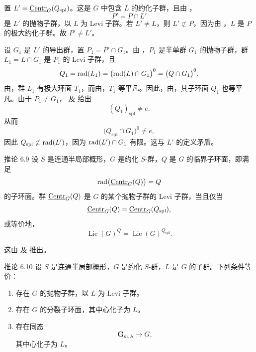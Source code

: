 置 \(L'=\underline{\operatorname{Centr}}_G(Q_{\mathrm{spl}})\)。这是 \(G\) 中包含 \(L\) 的约化子群，且由 ，
\[
 P'=P\cap L'
\]
是 \(L'\) 的抛物子群，以 \(L\) 为 Levi 子群。若 \(L'\ne L\)，则 \(L'\not\subset P\)，因为由 ，\(L\) 是 \(P\) 的极大约化子群。故 \(P'\ne L'\)。

设 \(G_1\) 是 \(L'\) 的导出群，置 \(P_1=P'\cap G_1\)。由 ，\(P_1\) 是半单群 \(G_1\) 的抛物子群，群 \(L_1=L\cap G_1\) 是 \(P_1\) 的 Levi 子群，且
\[
 Q_1=\operatorname{rad}(L_1)
    =\bigl(\operatorname{rad}(L)\cap G_1\bigr)^0
    =\bigl(Q\cap G_1\bigr)^0.
\]
由，群 \(L_1\) 有极大环面 \(T_1\)，而由，\(T_1\) 等平凡。因此，由，其子环面 \(Q_1\) 也等平凡。由于 \(P_1\ne G_1\)， 及  给出
\[
 (Q_1)_{\mathrm{spl}}\ne e.
\]
从而
\[
 \bigl(Q_{\mathrm{spl}}\cap G_1\bigr)^0\ne e,
\]
因此 \(Q_{\mathrm{spl}}\not\subset\operatorname{rad}(L')\)，因为 \(\operatorname{rad}(L')\cap G_1\) 有限。这与 \(L'\) 的定义矛盾。
\SGAQED


\begin{sgastatement}{推论 6.9}
设 \(S\) 是连通半局部概形，\(G\) 是约化 \(S\)-群，\(Q\) 是 \(G\) 的临界子环面，即满足
\[
 \operatorname{rad}\bigl(\underline{\operatorname{Centr}}_G(Q)\bigr)=Q
\]
的子环面。群 \(\underline{\operatorname{Centr}}_G(Q)\) 是 \(G\) 的某个抛物子群的 Levi 子群，当且仅当
\[
 \underline{\operatorname{Centr}}_G(Q)=\underline{\operatorname{Centr}}_G(Q_{\mathrm{spl}}),
\]
或等价地，
\[
 \operatorname{Lie}(G)^Q
   =\operatorname{Lie}(G)^{Q_{\mathrm{spl}}}.
\]
\end{sgastatement}

这由  及  推出。

\begin{sgastatement}{推论 6.10}
设 \(S\) 是连通半局部概形，\(G\) 是约化 \(S\)-群，\(L\) 是 \(G\) 的子群。下列条件等价：
\begin{enumerate}[label=\textup{(\roman*)}]
\item 存在 \(G\) 的抛物子群，以 \(L\) 为 Levi 子群。
\item 存在 \(G\) 的分裂子环面，其中心化子为 \(L\)。
\item 存在同态
\[
 \mathbf G_{m,S}\longrightarrow G,
\]
其中心化子为 \(L\)。
\end{enumerate}
\end{sgastatement}

